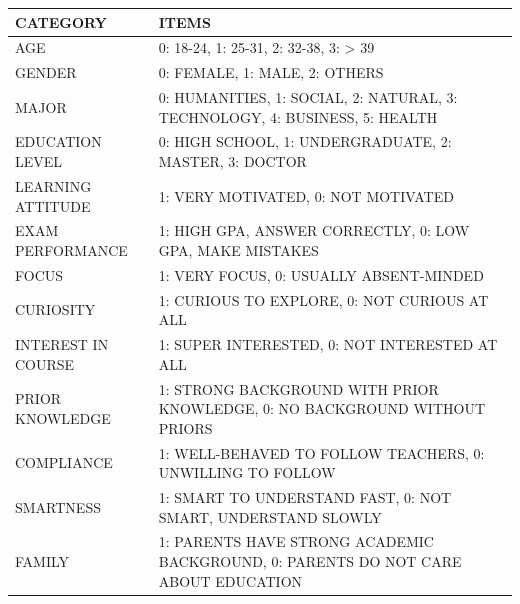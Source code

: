 \begin{tabular}{ll}
\toprule
CATEGORY & ITEMS \\
\midrule
AGE & 0: 18-24, 1: 25-31, 2: 32-38, 3: > 39 \\
GENDER & 0: FEMALE, 1: MALE, 2: OTHERS \\
MAJOR & 0: HUMANITIES, 1: SOCIAL, 2: NATURAL, 3: TECHNOLOGY, 4: BUSINESS, 5: HEALTH \\
EDUCATION LEVEL & 0: HIGH SCHOOL, 1: UNDERGRADUATE, 2: MASTER, 3: DOCTOR \\
LEARNING ATTITUDE & 1: VERY MOTIVATED, 0: NOT MOTIVATED \\
EXAM PERFORMANCE & 1: HIGH GPA, ANSWER CORRECTLY, 0: LOW GPA, MAKE MISTAKES \\
FOCUS & 1: VERY FOCUS, 0: USUALLY ABSENT-MINDED \\
CURIOSITY & 1: CURIOUS TO EXPLORE, 0: NOT CURIOUS AT ALL \\
INTEREST IN COURSE & 1: SUPER INTERESTED, 0: NOT INTERESTED AT ALL \\
PRIOR KNOWLEDGE & 1: STRONG BACKGROUND WITH PRIOR KNOWLEDGE, 0: NO BACKGROUND WITHOUT PRIORS \\
COMPLIANCE & 1: WELL-BEHAVED TO FOLLOW TEACHERS, 0: UNWILLING TO FOLLOW \\
SMARTNESS & 1: SMART TO UNDERSTAND FAST, 0: NOT SMART, UNDERSTAND SLOWLY \\
FAMILY & 1: PARENTS HAVE STRONG ACADEMIC BACKGROUND, 0: PARENTS DO NOT CARE ABOUT EDUCATION \\
\bottomrule
\end{tabular}
